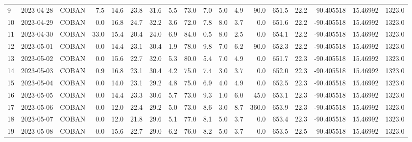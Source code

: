 \documentclass[12pt]{article}
\begin{document}
\begin{center}
\begin{tabular}{lllrrrrrrrrrrrrrrr}
9   & 2023-04-28 &  COBAN &     7.5 &  14.6 &   23.8 &  31.6 &      5.5 &     73.0 &        7.0 &  5.0 &         4.9 &        90.0 &      651.5 &        22.2 & -90.405518 &  15.46992 &   1323.0 \\
10  & 2023-04-29 &  COBAN &     0.0 &  16.8 &   24.7 &  32.2 &      3.6 &     72.0 &        7.8 &  8.0 &         3.7 &         0.0 &      651.6 &        22.2 & -90.405518 &  15.46992 &   1323.0 \\
11  & 2023-04-30 &  COBAN &    33.0 &  15.4 &   20.4 &  24.0 &      6.9 &     84.0 &        0.5 &  8.0 &         2.5 &         0.0 &      654.1 &        22.2 & -90.405518 &  15.46992 &   1323.0 \\
12  & 2023-05-01 &  COBAN &     0.0 &  14.4 &   23.1 &  30.4 &      1.9 &     78.0 &        9.8 &  7.0 &         6.2 &        90.0 &      652.3 &        22.2 & -90.405518 &  15.46992 &   1323.0 \\
13  & 2023-05-02 &  COBAN &     0.0 &  15.6 &   22.7 &  32.0 &      5.3 &     80.0 &        5.4 &  7.0 &         4.9 &         0.0 &      651.7 &        22.3 & -90.405518 &  15.46992 &   1323.0 \\
14  & 2023-05-03 &  COBAN &     0.9 &  16.8 &   23.1 &  30.4 &      4.2 &     75.0 &        7.4 &  3.0 &         3.7 &         0.0 &      652.0 &        22.3 & -90.405518 &  15.46992 &   1323.0 \\
15  & 2023-05-04 &  COBAN &     0.0 &  14.0 &   23.1 &  29.2 &      4.8 &     75.0 &        6.9 &  4.0 &         4.9 &         0.0 &      652.5 &        22.3 & -90.405518 &  15.46992 &   1323.0 \\
16  & 2023-05-05 &  COBAN &     0.0 &  14.4 &   23.3 &  30.6 &      5.7 &     73.0 &        9.3 &  1.0 &         6.0 &        45.0 &      653.1 &        22.3 & -90.405518 &  15.46992 &   1323.0 \\
17  & 2023-05-06 &  COBAN &     0.0 &  12.0 &   22.4 &  29.2 &      5.0 &     73.0 &        8.6 &  3.0 &         8.7 &       360.0 &      653.9 &        22.3 & -90.405518 &  15.46992 &   1323.0 \\
18  & 2023-05-07 &  COBAN &     0.0 &  12.0 &   21.8 &  29.6 &      5.1 &     77.0 &        8.1 &  5.0 &         3.7 &         0.0 &      653.4 &        22.3 & -90.405518 &  15.46992 &   1323.0 \\
19  & 2023-05-08 &  COBAN &     0.0 &  15.6 &   22.7 &  29.0 &      6.2 &     76.0 &        8.2 &  5.0 &         3.7 &         0.0 &      653.5 &        22.5 & -90.405518 &  15.46992 &   1323.0 \\

\end{tabular}
\end{center}
\end{document}
